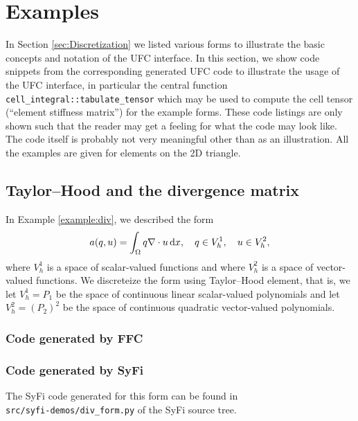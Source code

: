\chapter{Examples}
\label{sec:formexamples}

\label{CodeGenExamples}
In Section \ref{sec:Discretization} we listed various forms to
illustrate the basic concepts and notation of the UFC interface. In
this section, we show code snippets from the corresponding generated
UFC code to illustrate the usage of the UFC interface, in particular
the central function \texttt{cell\_integral::tabulate\_tensor} which
may be used to compute the cell tensor (``element stiffness matrix'')
for the example forms.  These code listings are only shown such that
the reader may get a feeling for what the code may look like. The code
itself is probably not very meaningful other than as an illustration.
All the examples are given for elements on the 2D triangle.

\section{Taylor--Hood and the divergence matrix}

In Example \ref{example:div}, we described  
the form 
\begin{equation}
a(q, u) = \int_{\Omega} q \nabla \cdot u \, \mathrm{d}x, \quad q\in V_h^1, \quad u\in V_h^2, 
\end{equation}
where $V_h^1$ is a space of scalar-valued functions and where $V_h^2$
is a space of vector-valued functions.  We discreteize the form using
Taylor--Hood element, that is, we let $V_h^1 = P_1$ be the space of
continuous linear scalar-valued polynomials and let $V_h^2 = (P_2)^2$
be the space of continuous quadratic vector-valued polynomials.

\subsection{Code generated by FFC}

\subsection{Code generated by SyFi}

The SyFi code generated for this form can be found in \\ 
\texttt{src/syfi-demos/div\_form.py} of the SyFi source tree.

